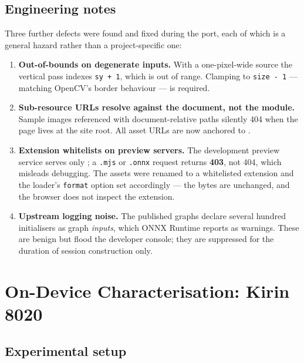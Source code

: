 \documentclass[journal]{IEEEtran}
\begin{document}
\subsection{Engineering notes}
Three further defects were found and fixed during the port, each of which is a
general hazard rather than a project-specific one:

\begin{enumerate}
\item \textbf{Out-of-bounds on degenerate inputs.} With a one-pixel-wide source
the vertical pass indexes \texttt{sy + 1}, which is out of range. Clamping to
\texttt{size - 1} --- matching OpenCV's border behaviour --- is required.
\item \textbf{Sub-resource URLs resolve against the document, not the module.}
Sample images referenced with document-relative paths silently 404 when the page
lives at the site root. All asset URLs are now anchored to
.
\item \textbf{Extension whitelists on preview servers.} The development preview
service serves only ; a
\texttt{.mjs} or \texttt{.onnx} request returns \textbf{403}, not 404, which
misleads debugging. The assets were renamed to a whitelisted extension and the
loader's \texttt{format} option set accordingly --- the bytes are unchanged, and
the browser does not inspect the extension.
\item \textbf{Upstream logging noise.} The published graphs declare several
hundred initialisers as graph \emph{inputs}, which ONNX Runtime reports as
warnings. These are benign but flood the developer console; they are suppressed
for the duration of session construction only.
\end{enumerate}

\section{On-Device Characterisation: Kirin 8020}
\label{sec:kirin}

\subsection{Experimental setup}
\end{document}
